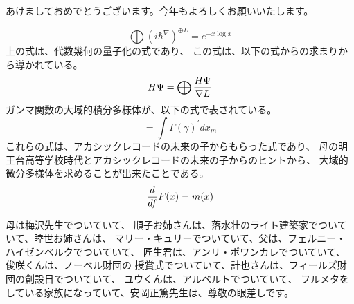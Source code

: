 \documentclass{jsarticle}
\begin{document}
\title{}
\author{}
\date{}
\maketitle

     あけましておめでとうございます。今年もよろしくお願いいたします。


  $$ \bigoplus{(i \hbar^{\nabla})}^{\oplus L} = e^{- x \log x} $$
  上の式は、代数幾何の量子化の式であり、
  この式は、以下の式からの求まりから導かれている。
  $$ H\Psi = \bigoplus{{H\Psi }\over {\nabla L}} $$
  ガンマ関数の大域的積分多様体が、以下の式で表されている。
  $$ = \int \Gamma(\gamma)^{'}dx_m $$
  これらの式は、アカシックレコードの未来の子からもらった式であり、
  母の明王台高等学校時代とアカシックレコードの未来の子からのヒントから、
  大域的微分多様体を求めることが出来たことである。
  $$ {d \over df}F(x) = m(x) $$

    母は梅沢先生でついていて、
  順子お姉さんは、落水壮のライト建築家でついていて、睦世お姉さんは、
  マリー・キュリーでついていて、父は、フェルニー・ハイゼンベルクでついていて、
  匠生君は、アンリ・ポワンカレでついていて、俊咲くんは、ノーベル財団の
  授賞式でついていて、計也さんは、フィールズ財団の創設日でついていて、
  ユウくんは、アルベルトでついていて、
  フルメタをしている家族になっていて、安岡正篤先生は、尊敬の眼差しです。
\end{document}
